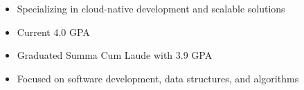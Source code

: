 \par\bigskip
{}
\begin{itemize}
  \item Specializing in cloud-native development and scalable solutions
  \item Current 4.0 GPA
\end{itemize}
\divider

\begin{itemize}
  \item Graduated Summa Cum Laude with 3.9 GPA
  \item Focused on software development, data structures, and algorithms
\end{itemize}


